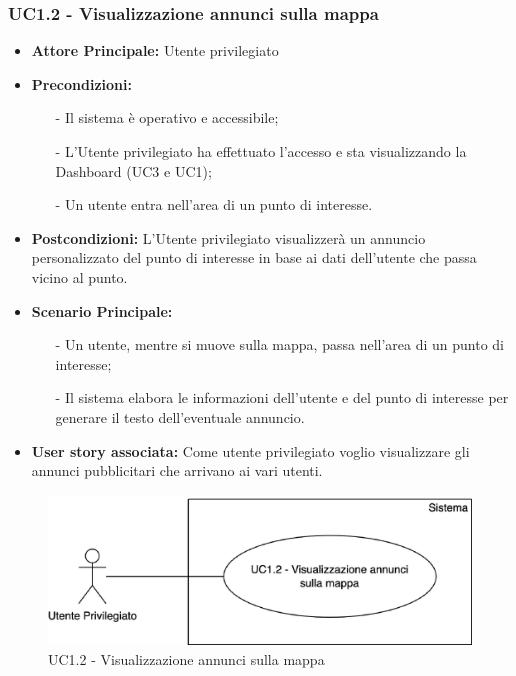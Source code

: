 \documentclass[11pt]{article}
\begin{document}
\begin{justify}
\subsubsection{\textbf{UC1.2 - Visualizzazione annunci sulla mappa}}
\begin{itemize}
	\item \textbf{Attore Principale:} Utente privilegiato
    \item \textbf{Precondizioni:} 
    	\begin{itemize}
    		\item [-] Il sistema è operativo e accessibile;
    		\item [-] L'Utente privilegiato ha effettuato l'accesso e sta visualizzando la Dashboard (UC3 e UC1);
    		\item [-] Un utente entra nell'area di un punto di interesse.
    	\end{itemize}
    \item \textbf{Postcondizioni:} L'Utente privilegiato visualizzerà un annuncio personalizzato del punto di 
    interesse in base ai dati dell'utente che passa vicino al punto.
    \item \textbf{Scenario Principale:} 
    \begin{itemize}
    		\item [-] Un utente, mentre si muove sulla mappa, passa nell'area di un punto di interesse;
    		\item [-] Il sistema elabora le informazioni dell'utente e del punto di interesse per generare il testo 
            dell'eventuale annuncio.
	\end{itemize}
    \item \textbf{User story associata:} Come utente privilegiato voglio visualizzare gli annunci pubblicitari che 
    arrivano ai vari utenti.
\end{itemize}
\begin{figure}[ht]
    \centering
    \includegraphics[width=0.5\linewidth]{UC1.2image.png}
    \caption{UC1.2 - Visualizzazione annunci sulla mappa}
    \label{fig:UC1.2}
\end{figure}

\end{justify}
\end{document}
